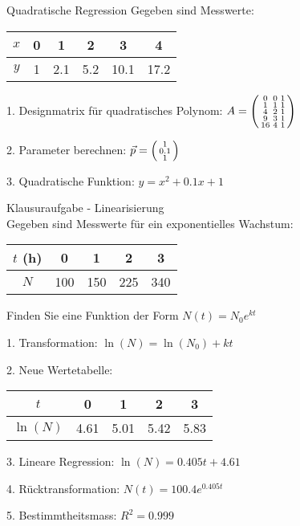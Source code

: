 \begin{example2}{Quadratische Regression}
Gegeben sind Messwerte:
\begin{center}
\begin{tabular}{|c|c|c|c|c|c|}
\hline
$x$ & 0 & 1 & 2 & 3 & 4 \\
\hline
$y$ & 1 & 2.1 & 5.2 & 10.1 & 17.2 \\
\hline
\end{tabular}
\end{center}

1. Designmatrix für quadratisches Polynom:
  $A = \begin{psmallmatrix}
   0 & 0 & 1 \\
   1 & 1 & 1 \\
   4 & 2 & 1 \\
   9 & 3 & 1 \\
   16 & 4 & 1
   \end{psmallmatrix}$

2. Parameter berechnen:
   $\vec{p} = \begin{psmallmatrix} 1 \\ 0.1 \\ 1 \end{psmallmatrix}$

3. Quadratische Funktion:
   $y = x^2 + 0.1x + 1$
\end{example2}



\begin{example2}{Klausuraufgabe - Linearisierung}\\
Gegeben sind Messwerte für ein exponentielles Wachstum:
\begin{center}
\begin{tabular}{|c|c|c|c|c|}
\hline
$t$ (h) & 0 & 1 & 2 & 3 \\
\hline
$N$ & 100 & 150 & 225 & 340 \\
\hline
\end{tabular}
\end{center}

Finden Sie eine Funktion der Form $N(t) = N_0 e^{kt}$

1. Transformation:
   $\ln(N) = \ln(N_0) + kt$

2. Neue Wertetabelle:
\begin{center}
\begin{tabular}{|c|c|c|c|c|}
\hline
$t$ & 0 & 1 & 2 & 3 \\
\hline
$\ln(N)$ & 4.61 & 5.01 & 5.42 & 5.83 \\
\hline
\end{tabular}
\end{center}

3. Lineare Regression:
   $\ln(N) = 0.405t + 4.61$

4. Rücktransformation:
   $N(t) = 100.4 e^{0.405t}$

5. Bestimmtheitsmass: $R^2 = 0.999$
\end{example2}